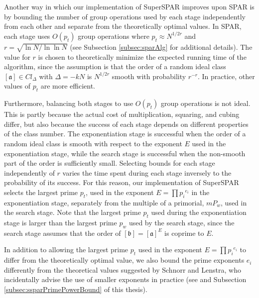 \documentclass{ucalgthes1}
\theoremstyle{definition}
\newcommand{\ideal}{\mathfrak}
\newcommand{\idealclass}[1]{\left[ \ideal #1 \right]}
\newcommand{\aclass}{\idealclass a}
\newcommand{\bclass}{\idealclass b}
\begin{document}
Another way in which our implementation of SuperSPAR improves upon SPAR is by bounding the number of group operations used by each stage independently from each other and separate from the theoretically optimal values.  In SPAR, each stage uses $O(p_t)$ group operations where $p_t \approx N^{1/2r}$ and $r = \sqrt{\ln N / \ln \ln N}$ (see Subsection \ref{subsec:sparAlg} for additional details).  The value for $r$ is chosen to theoretically minimize the expected running time of the algorithm, since the assumption is that the order of a random ideal class $\aclass \in Cl_\Delta$ with $\Delta = -kN$ is $N^{1/2r}$ smooth with probability $r^{-r}$.  In practice, other values of $p_t$ are more efficient.  

Furthermore, balancing both stages to use $O(p_t)$ group operations is not ideal.  This is partly because the actual cost of multiplication, squaring, and cubing differ, but also because the success of each stage depends on different properties of the class number.  The exponentiation stage is successful when the order of a random ideal class is smooth with respect to the exponent $E$ used in the exponentiation stage, while the search stage is successful when the non-smooth part of the order is sufficiently small.  Selecting bounds for each stage independently of $r$ varies the time spent during each stage inversely to the probability of its success.  For this reason, our implementation of SuperSPAR selects the largest prime $p_t$, used in the exponent $E = \prod {p_i}^{e_i}$ in the exponentiation stage, separately from the multiple of a primorial, $mP_w$, used in the search stage.  Note that the largest prime $p_t$ used during the exponentiation stage is larger than the largest prime $p_w$ used by the search stage, since the search stage assumes that the order of $\bclass = \aclass^E$ is coprime to $E$.

In addition to allowing the largest prime $p_t$ used in the exponent $E = \prod {p_i}^{e_i}$ to differ from the theoretically optimal value, we also bound the prime exponents $e_i$ differently from the theoretical values suggested by Schnorr and Lenstra, who incidentally advise the use of smaller exponents in practice (see \cite[p.293]{Schnorr1984} and Subsection \ref{subsec:ssparPrimePowerBound} of this thesis).
\end{document}
